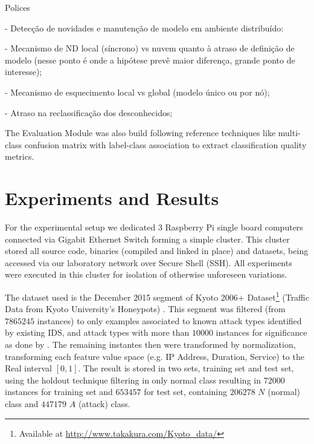 \documentclass[conference]{IEEEtran}
\begin{document}
Polices

- Detecção de novidades e manutenção de modelo em ambiente distribuído:

  - Mecanismo de ND local (síncrono) vs nuvem quanto à atraso de definição de modelo
    (nesse ponto é onde a hipótese prevê maior diferença, grande ponto de interesse);

  - Mecanismo de esquecimento local vs global (modelo único ou por nó);

  - Atraso na reclassificação dos desconhecidos;


The Evaluation Module was also build following reference techniques like
multi-class confusion matrix with label-class association
\cite{Faria2016minas}
to extract classification quality metrics.

\section{Experiments and Results}\label{sec:experiments}

For the experimental setup we dedicated 3 Raspberry Pi single board computers
connected via Gigabit Ethernet Switch forming a simple cluster.
This cluster stored all source code, binaries (compiled and linked in place) and
datasets, being accessed via our laboratory network over Secure Shell (SSH).
All experiments were executed in this cluster for isolation of otherwise unforeseen
variations.

The dataset used is the December 2015 segment of
Kyoto 2006+ Dataset\footnote{Available at \url{http://www.takakura.com/Kyoto_data/}}
(Traffic Data from Kyoto University's Honeypots)
\cite{Song2011}.
This segment was filtered (from $7 865 245$ instances) to only examples
associated to known attack types identified by existing IDS, and attack types
with more than $10 000$ instances for significance as done by \cite{Cassales2019a}.
The remaining instantes then were transformed by normalization, transforming
each feature value space (e.g. IP Address, Duration, Service) to the
Real interval $[0, 1]$.
The result is stored in two sets, training set and test set, using the holdout
technique filtering in only normal class resulting in $72 000$ instances for
training set and $653 457$ for test set, containing $206 278$ $N$ (normal) class
and $447 179$ $A$ (attack) class.

\end{document}
